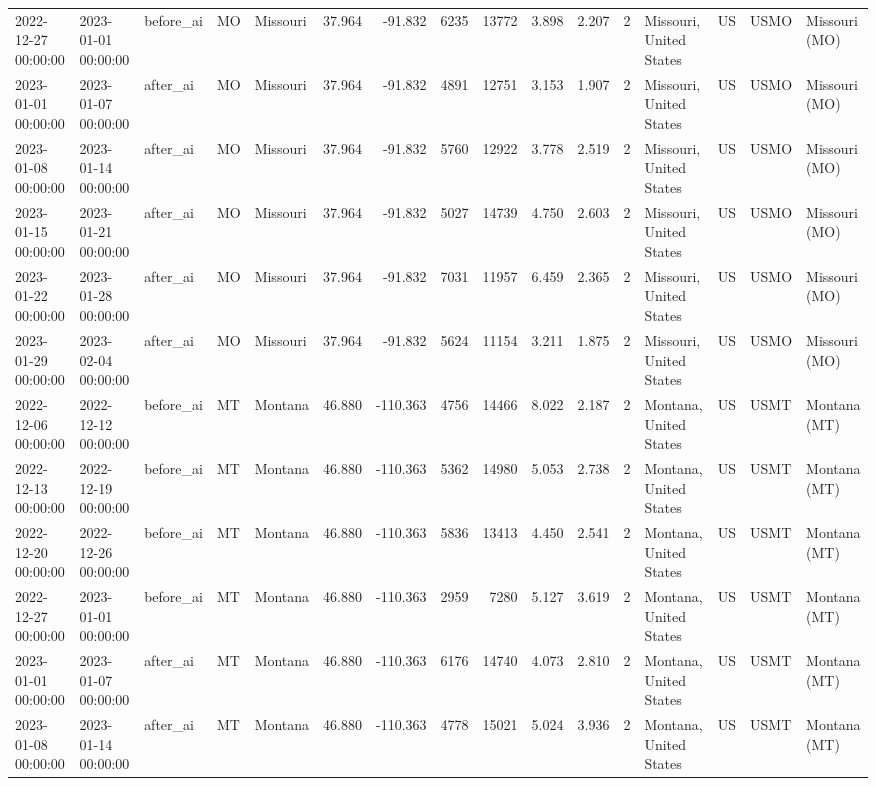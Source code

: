 \begin{tabular}{lllllrrrrrrlllll}
2022-12-27 00:00:00 & 2023-01-01 00:00:00 & before\_ai & MO & Missouri & 37.964 & -91.832 & 6235 & 13772 & 3.898 & 2.207 & 2 & Missouri, United States & US & USMO & Missouri (MO) \\
2023-01-01 00:00:00 & 2023-01-07 00:00:00 & after\_ai & MO & Missouri & 37.964 & -91.832 & 4891 & 12751 & 3.153 & 1.907 & 2 & Missouri, United States & US & USMO & Missouri (MO) \\
2023-01-08 00:00:00 & 2023-01-14 00:00:00 & after\_ai & MO & Missouri & 37.964 & -91.832 & 5760 & 12922 & 3.778 & 2.519 & 2 & Missouri, United States & US & USMO & Missouri (MO) \\
2023-01-15 00:00:00 & 2023-01-21 00:00:00 & after\_ai & MO & Missouri & 37.964 & -91.832 & 5027 & 14739 & 4.750 & 2.603 & 2 & Missouri, United States & US & USMO & Missouri (MO) \\
2023-01-22 00:00:00 & 2023-01-28 00:00:00 & after\_ai & MO & Missouri & 37.964 & -91.832 & 7031 & 11957 & 6.459 & 2.365 & 2 & Missouri, United States & US & USMO & Missouri (MO) \\
2023-01-29 00:00:00 & 2023-02-04 00:00:00 & after\_ai & MO & Missouri & 37.964 & -91.832 & 5624 & 11154 & 3.211 & 1.875 & 2 & Missouri, United States & US & USMO & Missouri (MO) \\
2022-12-06 00:00:00 & 2022-12-12 00:00:00 & before\_ai & MT & Montana & 46.880 & -110.363 & 4756 & 14466 & 8.022 & 2.187 & 2 & Montana, United States & US & USMT & Montana (MT) \\
2022-12-13 00:00:00 & 2022-12-19 00:00:00 & before\_ai & MT & Montana & 46.880 & -110.363 & 5362 & 14980 & 5.053 & 2.738 & 2 & Montana, United States & US & USMT & Montana (MT) \\
2022-12-20 00:00:00 & 2022-12-26 00:00:00 & before\_ai & MT & Montana & 46.880 & -110.363 & 5836 & 13413 & 4.450 & 2.541 & 2 & Montana, United States & US & USMT & Montana (MT) \\
2022-12-27 00:00:00 & 2023-01-01 00:00:00 & before\_ai & MT & Montana & 46.880 & -110.363 & 2959 & 7280 & 5.127 & 3.619 & 2 & Montana, United States & US & USMT & Montana (MT) \\
2023-01-01 00:00:00 & 2023-01-07 00:00:00 & after\_ai & MT & Montana & 46.880 & -110.363 & 6176 & 14740 & 4.073 & 2.810 & 2 & Montana, United States & US & USMT & Montana (MT) \\
2023-01-08 00:00:00 & 2023-01-14 00:00:00 & after\_ai & MT & Montana & 46.880 & -110.363 & 4778 & 15021 & 5.024 & 3.936 & 2 & Montana, United States & US & USMT & Montana (MT) \\

\end{tabular}
